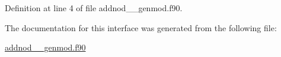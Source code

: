 Definition at line 4 of file addnod\+\_\+\+\_\+genmod.\+f90.



The documentation for this interface was generated from the following file\+:\begin{DoxyCompactItemize}
\item 
\hyperlink{addnod____genmod_8f90}{addnod\+\_\+\+\_\+genmod.\+f90}\end{DoxyCompactItemize}
